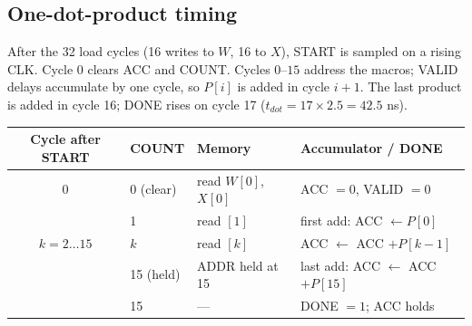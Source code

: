 \documentclass[10pt,letterpaper]{article}
\begin{document}
\subsection{One-dot-product timing}
After the 32 load cycles (16 writes to $W$, 16 to $X$), START is sampled on a rising CLK. Cycle 0 clears ACC and COUNT. Cycles $0$--$15$ address the macros; VALID delays accumulate by one cycle, so $P[i]$ is added in cycle $i+1$. The last product is added in cycle 16; DONE rises on cycle 17 ($t_{dot}=17\times2.5=42.5$ ns).
\begin{center}\small\begin{tabularx}{\linewidth}{@{}c l l L@{}}\toprule
Cycle after START & COUNT & Memory & Accumulator / DONE\\ & 0 (clear) & read $W[0]$, $X[0]$ & ACC $=0$, VALID $=0$\\ & 1 & read $[1]$ & first add: ACC $\leftarrow P[0]$\\\addlinespace
$k=2\ldots 15$ & $k$ & read $[k]$ & ACC $\leftarrow$ ACC $+P[k-1]$\\ & 15 (held) & ADDR held at 15 & last add: ACC $\leftarrow$ ACC $+P[15]$\\ & 15 & --- & DONE $=1$; ACC holds\\\bottomrule
\end{tabularx}\end{center}
\end{document}
